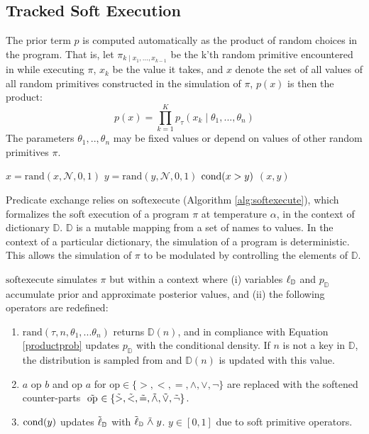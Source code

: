 \subsection{Tracked Soft Execution}
The prior term $p$ is computed automatically as the product of random choices in the program. 
That is, let $\pi_{k \mid x_1, ..., x_{k-1}}$ be the k'th random primitive encountered in while executing $\pi$, $x_k$ be the value it takes, and $x$ denote the set of all values of all random primitives constructed in the simulation of $\pi$, $p(x)$ is then the product:
\begin{equation}\label{productprob}
p(x) = \prod_{k=1}^K p_\tau(x_k \mid \theta_1,..., \theta_n )
\end{equation}
The parameters $\theta_1,..,\theta_n$ may be fixed values or depend on values of other random primitives $\pi$.

\begin{exprogram}[tb]
\caption{}
\label{prog:ex1}
\begin{algorithmic}
\STATE $x = \textrm{rand}(x, \mathcal{N}, 0, 1)$
\STATE $y = \textrm{rand}(y, \mathcal{N}, 0, 1)$
\STATE $\operatorname{cond}(x > y)$
 $(x, y)$
\end{algorithmic}
\end{exprogram}


Predicate exchange relies on $\textrm{softexecute}$
(Algorithm \ref{alg:softexecute}), which formalizes the soft execution of a program $\pi$ at temperature $\alpha$, in the context of dictionary $\mathbb{D}$.
$\mathbb{D}$ is a mutable mapping from a set of names to values.
In the context of a particular dictionary, the simulation of a program is deterministic.
This allows the simulation of $\pi$ to be modulated by controlling the elements of $\mathbb{D}$.

$\textrm{softexecute}$ simulates $\pi$ but within a context where (i) variables $\operatorname{\ell}_\mathbb{D}$ and $p_\mathbb{D}$ accumulate prior and approximate posterior values, and (ii) the following operators are redefined:

\begin{enumerate}
  \item $\textrm{rand}(\tau, n, \theta_1, ...\theta_n)$ returns $\mathbb{D}(n)$, and in compliance with Equation \ref{productprob} updates $p_\mathbb{D}$ with the conditional density. If $n$ is not a key in $\mathbb{D}$, the distribution is sampled from and $\mathbb{D}(n)$ is updated with this value.  
  \item $a \text{ op } b$ and $\textrm{op } a$ for $\textrm{op} \in \{>, <, =, \land, \lor, \neg\}$ are replaced with the softened counter-parts $\mathrel{\tilde{\textrm{ op }}} \in \{\mathrel{\tilde{>}}, \mathrel{\tilde{<}}, \mathrel{\tilde{=}}, \mathrel{\tilde{\land}}, \mathrel{\tilde{\lor}}, \mathrel{\tilde{\neg}}\}$.
  \item $\operatorname{cond}(y)$ updates $\tilde{\operatorname{\ell}}_\mathbb{D}$ with $\tilde{\operatorname{\ell}}_\mathbb{D} \mathrel{\tilde{\land}} y$. $y \in [0,1]$ due to soft primitive operators.  
\end{enumerate}

